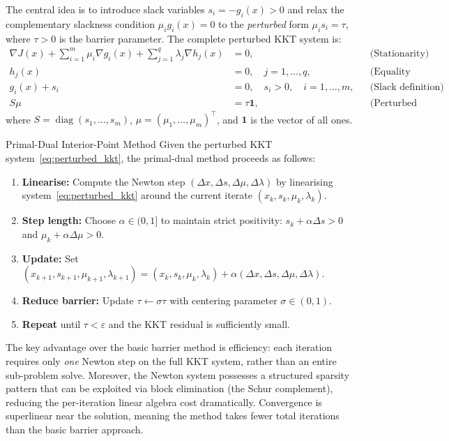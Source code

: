 The central idea is to introduce slack variables $s_i = -g_i(x) > 0$ and relax the complementary slackness condition $\mu_i g_i(x) = 0$ to the \emph{perturbed} form $\mu_i s_i = \tau$, where $\tau > 0$ is the barrier parameter. The complete perturbed KKT system is:
\begin{equation}
	\begin{aligned}
		\nabla J(x) + \sum_{i=1}^{m} \mu_i \nabla g_i(x) + \sum_{j=1}^{q} \lambda_j \nabla h_j(x) &= 0, & & \text{(Stationarity)} \\
		h_j(x) &= 0, \quad j = 1,\ldots,q, & & \text{(Equality feasibility)} \\
		g_i(x) + s_i &= 0, \quad s_i > 0, \quad i = 1,\ldots,m, & & \text{(Slack definition)} \\
		S \mu &= \tau \mathbf{1}, & & \text{(Perturbed complementarity)}
	\end{aligned}
	\label{eq:perturbed_kkt}
\end{equation}
where $S = \operatorname{diag}(s_1, \ldots, s_m)$, $\mu = (\mu_1,\ldots,\mu_m)^\top$, and $\mathbf{1}$ is the vector of all ones.

\begin{defnbox}{Primal-Dual Interior-Point Method}
	Given the perturbed KKT system~\eqref{eq:perturbed_kkt}, the primal-dual method proceeds as follows:
	\begin{enumerate}
		\item \textbf{Linearise:} Compute the Newton step $(\Delta x, \Delta s, \Delta \mu, \Delta \lambda)$ by linearising system~\eqref{eq:perturbed_kkt} around the current iterate $(x_k, s_k, \mu_k, \lambda_k)$.
		\item \textbf{Step length:} Choose $\alpha \in (0, 1]$ to maintain strict positivity: $s_k + \alpha \Delta s > 0$ and $\mu_k + \alpha \Delta \mu > 0$.
		\item \textbf{Update:} Set $(x_{k+1}, s_{k+1}, \mu_{k+1}, \lambda_{k+1}) = (x_k, s_k, \mu_k, \lambda_k) + \alpha (\Delta x, \Delta s, \Delta \mu, \Delta \lambda)$.
		\item \textbf{Reduce barrier:} Update $\tau \leftarrow \sigma \tau$ with centering parameter $\sigma \in (0, 1)$.
		\item \textbf{Repeat} until $\tau < \varepsilon$ and the KKT residual is sufficiently small.
	\end{enumerate}
\end{defnbox}

The key advantage over the basic barrier method is efficiency: each iteration requires only \emph{one} Newton step on the full KKT system, rather than an entire sub-problem solve. Moreover, the Newton system possesses a structured sparsity pattern that can be exploited via block elimination (the Schur complement), reducing the per-iteration linear algebra cost dramatically. Convergence is superlinear near the solution, meaning the method takes fewer total iterations than the basic barrier approach.

